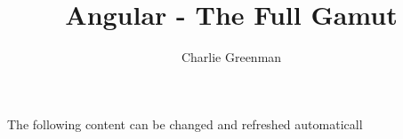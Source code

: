 \documentclass{article}
\title{Angular - The Full Gamut}
\author{Charlie Greenman}
\begin{document}
\tableofcontents

The following content can be changed and refreshed automaticall
\end{document}
